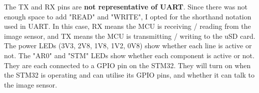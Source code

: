 The TX and RX pins are \textbf{not representative of UART}. Since there was not enough space to add "READ" and "WRITE", I opted for the shorthand notation used in UART. In this case, RX means the MCU is receiving / reading from the image sensor, and TX means the MCU is transmitting / writing to the uSD card.
\nl
The power LEDs (3V3, 2V8, 1V8, 1V2, 0V8) show whether each line is active or not.
\nl
The "AR0" and "STM" LEDs show whether each component is active or not. They are each connected to a GPIO pin on the STM32. They will turn on when the STM32 is operating and can utilise its GPIO pins, and whether it can talk to the image sensor.
